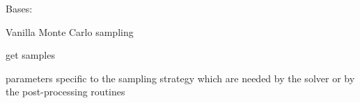 \documentclass[letterpaper,10pt,english]{sphinxmanual}
\begin{document}
\begin{fulllineitems}
\label{\detokenize{sampling:sampling.sampling.MonteCarlo}}
Bases: {\hyperref[\detokenize{sampling:sampling.sampling.Sampling}]{}}

Vanilla Monte Carlo sampling

\begin{fulllineitems}
\label{\detokenize{sampling:sampling.sampling.MonteCarlo.get}}
get samples

\end{fulllineitems}


\begin{fulllineitems}
\label{\detokenize{sampling:sampling.sampling.MonteCarlo.sampling_prms}}
parameters specific to the sampling strategy which are
needed by the solver or by the post-processing routines

\end{fulllineitems}


\end{fulllineitems}

\end{document}
